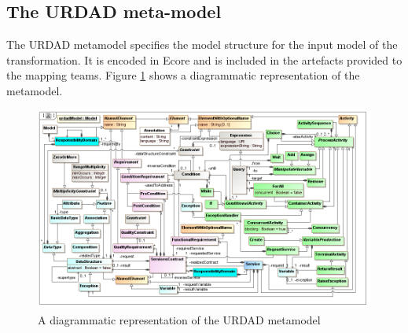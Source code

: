 \subsection{The URDAD meta-model}

The URDAD metamodel specifies the model structure for the input model of the transformation. It is encoded in Ecore and is included in the artefacts provided to the mapping teams. Figure \ref{fig:metamodel} shows a diagrammatic representation of the metamodel. 

\begin{figure}
  \centering
  \includegraphics[width=\linewidth]{metamodel}
  \caption{A diagrammatic representation of the URDAD metamodel}
  \label{fig:metamodel}
\end{figure}


